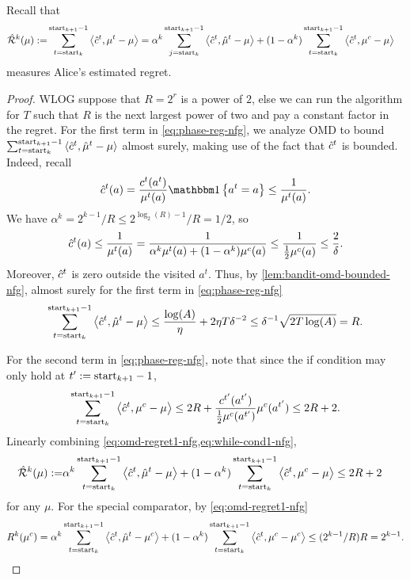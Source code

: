 Recall that 
\begin{align}
    \hat{\mathcal{R}}^k(\mu):=& \sum_{t=\text{start}_k}^{\text{start}_{k+1}-1} \left\langle \hat{c}^t, \mu^t-\mu \right\rangle = \alpha^k \sum_{j=\text{start}_k}^{\text{start}_{k+1}-1} \left\langle \hat{c}^t, \hat{\mu}^t-\mu \right\rangle + (1-\alpha^k) \sum_{t=\text{start}_{k}}^{\text{start}_{k+1}-1} \left\langle \hat{c}^t, \mu^c-\mu \right\rangle \label{eq:phase-reg-nfg}
\end{align}
measures Alice's estimated regret.

\lemmaDuringNfg*

\begin{proof}
    WLOG suppose that $R=2^r$ is a power of $2$, else we can run the algorithm for $T$ such that $R$ is the next largest power of two and pay a constant factor in the regret. For the first term in \cref{eq:phase-reg-nfg}, we analyze OMD to bound $\sum_{t=\text{start}_{k}}^{\text{start}_{k+1}-1} \left\langle \hat{c}^t, \hat{\mu}^t-\mu \right\rangle$ almost surely, making use of the fact that $\hat{c}^t$ is bounded. Indeed, recall 
    \begin{align*}
        \cHat^t(a) = \frac{c^t(a^t)}{\mu^t(a)}\indicator{a^t=a} \leq \frac{1}{\mu^t(a)}.
    \end{align*}
    We have $\alpha^k = 2^{k-1}/R \leq 2^{\log_2(R)-1}/R=1/2$, so 
    \begin{align*}
        \hat{c}^t(a) \leq \frac{1}{\mu^t(a)}=\frac{1}{\alpha^k\mu^t(a)+(1-\alpha^k)\mu^c(a)}\leq\frac{1}{\frac{1}{2}\mu^c(a)}\leq \frac{2}{\delta}.
    \end{align*}
    Moreover, $\hat{c}^t$ is zero outside the visited $a^t$. Thus, by \cref{lem:bandit-omd-bounded-nfg}, almost surely for the first term in \cref{eq:phase-reg-nfg}
    \begin{align}
        \sum_{t=\text{start}_{k}}^{\text{start}_{k+1}-1} \left\langle \hat{c}^t, \hat{\mu}^t-\mu \right\rangle \leq \frac{\log(A)}{\eta} + 2\eta T\delta^{-2} \leq \delta^{-1}\sqrt{2T\log(A)} = R. \label{eq:omd-regret1-nfg}
    \end{align}

    \noindent For the second term in \cref{eq:phase-reg-nfg}, note that since the if condition may only hold at $t':=\text{start}_{k+1}-1$,
    \begin{align}
        \sum_{t=\text{start}_{k}}^{\text{start}_{k+1}-1} \left\langle \hat{c}^t, \mu^c-\mu \right\rangle \leq 2R + \frac{c^{t'}(a^{t'})}{\frac{1}{2}\mu^c(a^{t'})}\mu^c(a^{t'})\leq 2R+2. \label{eq:while-cond1-nfg}
    \end{align}
    \noindent Linearly combining \cref{eq:omd-regret1-nfg,eq:while-cond1-nfg}, 
    \begin{align*}
        \hat{\mathcal{R}}^k(\mu):=& \alpha^k \sum_{t=\text{start}_{k}}^{\text{start}_{k+1}-1} \left\langle \hat{c}^t, \hat{\mu}^t-\mu \right\rangle + (1-\alpha^k) \sum_{t=\text{start}_k}^{\text{start}_{k+1}-1} \left\langle \hat{c}^t, \mu^c-\mu \right\rangle \leq 2R +2
    \end{align*}
    for any $\mu$. For the special comparator, by \cref{eq:omd-regret1-nfg}
    \begin{align*}
        R^k(\mu^c)= \alpha^k \sum_{t=\text{start}_{k}}^{\text{start}_{k+1}-1} \left\langle \hat{c}^t, \hat{\mu}^t-\mu^c \right\rangle + (1-\alpha^k) \sum_{t=\text{start}_{k}}^{\text{start}_{k+1}-1} \left\langle \hat{c}^t, \mu^c-\mu^c \right\rangle \leq (2^{k-1}/R)R = 2^{k-1}. 
    \end{align*}
\end{proof}


